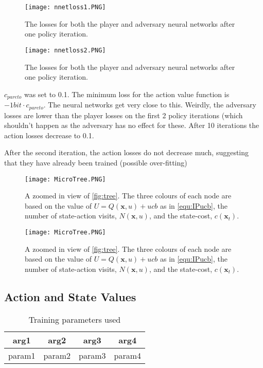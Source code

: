 \documentclass[../main.tex]{subfiles}
\begin{document}
\begin{figure}[h]
    \centering
    \texttt{[image: nnetloss1.PNG]}
    \caption{The losses for both the player and adversary neural networks after one policy iteration.}
    \label{fig:nnetlosses0}
\end{figure}

\begin{figure}[h]
    \centering
    \texttt{[image: nnetloss2.PNG]}
    \caption{The losses for both the player and adversary neural networks after one policy iteration.}
    \label{fig:nnetlosses0}
\end{figure}

$c_{pareto}$ was set to 0.1. The minimum loss for the action value function is $-1bit \cdot c_{pareto}$. The neural networks get very close to this. Weirdly, the adversary losses are lower than the player losses on the first 2 policy iterations (which shouldn't happen as the adversary has no effect for these. After 10 iterations the action losses decrease to 0.1.

After the second iteration, the action losses do not decrease much, suggesting that they have already been trained (possible over-fitting)

\begin{figure}[h]
    \centering
    \texttt{[image: MicroTree.PNG]}
    \caption{A zoomed in view of \cref{fig:tree}. The three colours of each node are based on the value of $U=Q(\boldsymbol{x}, u) + ucb$ as in \cref{equ:IPucb}, the number of state-action visits, $N(\boldsymbol{x}, u)$, and the state-cost, $c(\boldsymbol{x}_t)$.}
    \label{fig:microtree}
\end{figure}

\begin{figure}[h]
    \centering
    \texttt{[image: MicroTree.PNG]}
    \caption{A zoomed in view of \cref{fig:tree}. The three colours of each node are based on the value of $U=Q(\boldsymbol{x}, u) + ucb$ as in \cref{equ:IPucb}, the number of state-action visits, $N(\boldsymbol{x}, u)$, and the state-cost, $c(\boldsymbol{x}_t)$.}
    \label{fig:microtree}
\end{figure}

\subsection{Action and State Values}

\begin{table}
\centering
\begin{tabular}{c | c | c | c}
    arg1 & arg2 & arg3 & arg4 \\
    \hline
    param1 & param2 & param3 & param4
\end{tabular}
\label{table:trainingparams}
\caption{Training parameters used}
\end{table}
\end{document}

